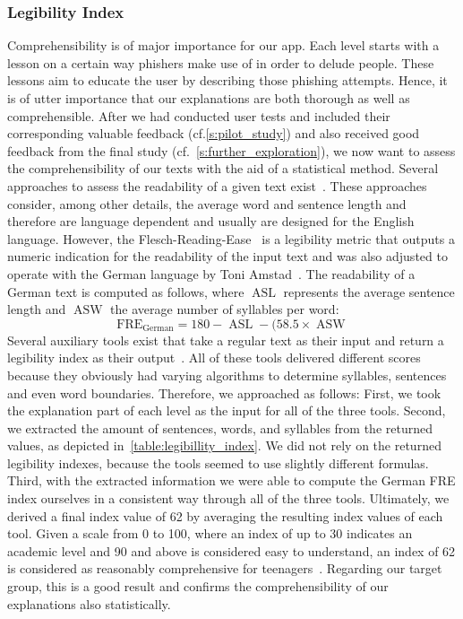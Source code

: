 \subsubsection{Legibility Index}
Comprehensibility is of major importance for our app. Each level starts with a lesson on a certain way phishers make use of in order to delude people. These lessons aim to educate the user by describing those phishing attempts. Hence, it is of utter importance that our explanations are both thorough as well as comprehensible. After we had conducted user tests and included their corresponding valuable feedback (cf.\autoref{s:pilot_study}) and also received good feedback from the final study (cf.~\autoref{s:further_exploration}), we now want to assess the comprehensibility of our texts with the aid of a statistical method. Several approaches to assess the readability of a given text exist~\cite{Gun,citeulike:7369187}. These approaches consider, among other details, the average word and sentence length and therefore are language dependent and usually are designed for the English language. However, the Flesch-Reading-Ease~\cite{citeulike:7369187} is a legibility metric that outputs a numeric indication for the readability of the input text and was also adjusted to operate with the German language by Toni Amstad~\cite{amstad1978verstaendlich}. The readability of a German text is computed as follows, where $\operatorname{ASL}$ represents the average sentence length and $\operatorname{ASW}$ the average number of syllables per word:
$$\operatorname{FRE_{German}} = 180-\operatorname{ASL}-(58.5\times\operatorname{ASW}$$
Several auxiliary tools exist that take a regular text as their input and return a legibility index as their output~\cite{leichtlesbar, stilversprechend,fleschindexde}. All of these tools delivered different scores because they obviously had varying algorithms to determine syllables, sentences and even word boundaries.
Therefore, we approached as follows: First, we took the explanation part of each level as the input for all of the three tools. Second, we extracted the amount of sentences, words, and syllables from the returned values, as depicted in~\autoref{table:legibillity_index}. We did not rely on the returned legibility indexes, because the tools seemed to use slightly different formulas. Third, with the extracted information we were able to compute the German FRE index ourselves in a consistent way through all of the three tools. Ultimately, we derived a final index value of 62 by averaging the resulting index values of each tool. Given a scale from 0 to 100, where an index of up to 30 indicates an academic level and 90 and above is considered easy to understand, an index of 62 is considered as reasonably comprehensive for teenagers~\cite{amstad1978verstandlich}. Regarding our target group, this is a good result and confirms the comprehensibility of our explanations also statistically.

